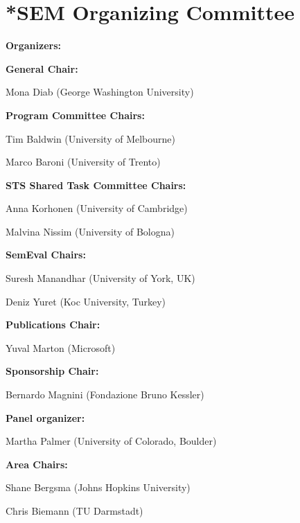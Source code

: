 \section*{*SEM Organizing Committee}

\begin{description}
\item{\bf Organizers:}%
%
\begin{description}
\item{\bf General Chair:}

Mona Diab (George Washington University)

\item{\bf Program Committee Chairs:}

Tim Baldwin (University of Melbourne)

Marco Baroni (University of Trento)

\item{\bf STS Shared Task Committee Chairs:}

Anna Korhonen (University of Cambridge)

Malvina Nissim (University of Bologna)

\item{\bf SemEval Chairs:}

Suresh Manandhar (University of York, UK)

Deniz Yuret (Koc University, Turkey)

\item{\bf Publications Chair:}

Yuval Marton (Microsoft)

\item{\bf Sponsorship Chair:}

Bernardo Magnini (Fondazione Bruno Kessler)

\item{\bf Panel organizer:}

Martha Palmer (University of Colorado, Boulder)

\item{\bf Area Chairs:}

  Shane Bergsma (Johns Hopkins University)

  Chris Biemann (TU Darmstadt)


\end{description}
\end{description}
